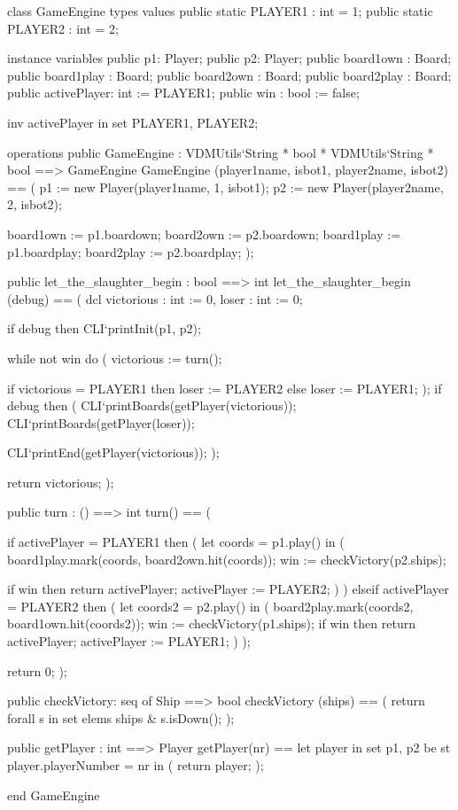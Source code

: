 \begin{vdm_al}
class GameEngine
 types
 values
  public static PLAYER1 : int = 1;
  public static PLAYER2 : int = 2;
  
 instance variables
  public p1: Player;
  public p2: Player;
  public board1own : Board;
  public board1play : Board;
  public board2own : Board;
  public board2play : Board;
  public activePlayer: int := PLAYER1;
  public win : bool := false;
  
  inv activePlayer in set {PLAYER1, PLAYER2};
  
 operations
  public GameEngine : VDMUtils`String * bool * VDMUtils`String * bool ==> GameEngine
   GameEngine (player1name, isbot1, player2name, isbot2) ==
   (
    p1 := new Player(player1name, 1, isbot1);
    p2 := new Player(player2name, 2, isbot2);
    
    board1own := p1.boardown;
    board2own := p2.boardown;
    board1play := p1.boardplay;
    board2play := p2.boardplay;
   );

  public let_the_slaughter_begin : bool ==> int
   let_the_slaughter_begin (debug) ==
   (
    dcl victorious : int := 0, loser : int := 0;
    
    if debug then CLI`printInit(p1, p2);
    
    while not win do
    (
     victorious := turn();
     
     if victorious = PLAYER1 then loser := PLAYER2
     else loser := PLAYER1;
    );
    if debug then (
     CLI`printBoards(getPlayer(victorious));
     CLI`printBoards(getPlayer(loser));
     
     CLI`printEnd(getPlayer(victorious));
    );
    
    return victorious;
   );

  public turn : () ==> int
   turn() == (
   
    if activePlayer = PLAYER1 then (
     let coords = p1.play() in
     (
      board1play.mark(coords, board2own.hit(coords));
      win := checkVictory(p2.ships);
      
      if win then return activePlayer;
      activePlayer := PLAYER2;
     )
    )
    elseif activePlayer = PLAYER2 then (
     let coords2 = p2.play() in
     (
      board2play.mark(coords2, board1own.hit(coords2));
      win := checkVictory(p1.ships);
      if win then return activePlayer;
      activePlayer := PLAYER1;
     )
    );
    
    return 0;
   );
  
  public checkVictory: seq of Ship ==> bool
   checkVictory (ships) ==
   (
    return forall s in set elems ships & s.isDown(); 
   );
   
  public getPlayer : int ==> Player
   getPlayer(nr) ==
    let player in set {p1, p2} be st player.playerNumber = nr in (
      return player;
    );


end GameEngine
\end{vdm_al}

